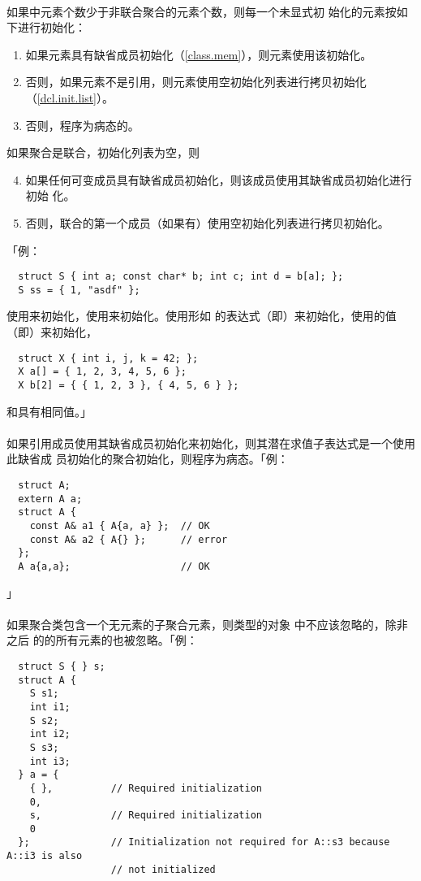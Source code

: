 \paragraph{}
如果中元素个数少于非联合聚合的元素个数，则每一个未显式初
始化的元素按如下进行初始化：
\begin{enumerate}
  \item{如果元素具有缺省成员初始化（\ref{class.mem}），则元素使用该初始化。}
  \item{否则，如果元素不是引用，则元素使用空初始化列表进行拷贝初始化
    （\ref{dcl.init.list}）。}
  \item{否则，程序为病态的。}
\end{enumerate}
如果聚合是联合，初始化列表为空，则
\begin{enumerate}
  \setcounter{enumi}{3}
  \item{如果任何可变成员具有缺省成员初始化，则该成员使用其缺省成员初始化进行初始
    化。}
  \item{否则，联合的第一个成员（如果有）使用空初始化列表进行拷贝初始化。}
\end{enumerate}
「例：
\begin{lstlisting}
  struct S { int a; const char* b; int c; int d = b[a]; };
  S ss = { 1, "asdf" };
\end{lstlisting}
使用来初始化，使用来初始化。使用形如
的表达式（即）来初始化，使用的值
（即）来初始化，
\begin{lstlisting}
  struct X { int i, j, k = 42; };
  X a[] = { 1, 2, 3, 4, 5, 6 };
  X b[2] = { { 1, 2, 3 }, { 4, 5, 6 } };
\end{lstlisting}
和具有相同值。」

\paragraph{}
如果引用成员使用其缺省成员初始化来初始化，则其潜在求值子表达式是一个使用此缺省成
员初始化的聚合初始化，则程序为病态。「例：
\begin{lstlisting}
  struct A;
  extern A a;
  struct A {
    const A& a1 { A{a, a} };  // OK
    const A& a2 { A{} };      // error
  };
  A a{a,a};                   // OK
\end{lstlisting}」

\paragraph{}
如果聚合类包含一个无元素的子聚合元素，则类型的对象
中不应该忽略的，除非之后
的的所有元素的也被忽略。「例：
\begin{lstlisting}
  struct S { } s;
  struct A {
    S s1;
    int i1;
    S s2;
    int i2;
    S s3;
    int i3;
  } a = {
    { },          // Required initialization
    0,
    s,            // Required initialization
    0
  };              // Initialization not required for A::s3 because A::i3 is also
                  // not initialized
\end{lstlisting}

